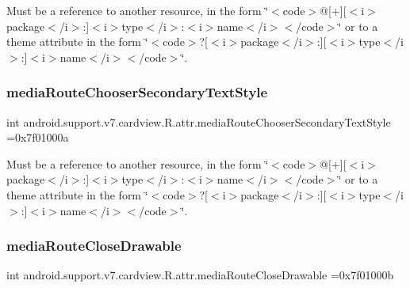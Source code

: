 Must be a reference to another resource, in the form \char`\"{}$<$code$>$@\mbox{[}+\mbox{]}\mbox{[}$<$i$>$package$<$/i$>$\+:\mbox{]}$<$i$>$type$<$/i$>$\+:$<$i$>$name$<$/i$>$$<$/code$>$\char`\"{} or to a theme attribute in the form \char`\"{}$<$code$>$?\mbox{[}$<$i$>$package$<$/i$>$\+:\mbox{]}\mbox{[}$<$i$>$type$<$/i$>$\+:\mbox{]}$<$i$>$name$<$/i$>$$<$/code$>$\char`\"{}. \mbox{\label{classandroid_1_1support_1_1v7_1_1cardview_1_1R_1_1attr_a9c40842d57e474f03ba0002459fc14d2}} 
\subsubsection{\texorpdfstring{media\+Route\+Chooser\+Secondary\+Text\+Style}{mediaRouteChooserSecondaryTextStyle}}
{\footnotesize\ttfamily int android.\+support.\+v7.\+cardview.\+R.\+attr.\+media\+Route\+Chooser\+Secondary\+Text\+Style =0x7f01000a\hspace{0.3cm}{\ttfamily [static]}}

Must be a reference to another resource, in the form \char`\"{}$<$code$>$@\mbox{[}+\mbox{]}\mbox{[}$<$i$>$package$<$/i$>$\+:\mbox{]}$<$i$>$type$<$/i$>$\+:$<$i$>$name$<$/i$>$$<$/code$>$\char`\"{} or to a theme attribute in the form \char`\"{}$<$code$>$?\mbox{[}$<$i$>$package$<$/i$>$\+:\mbox{]}\mbox{[}$<$i$>$type$<$/i$>$\+:\mbox{]}$<$i$>$name$<$/i$>$$<$/code$>$\char`\"{}. \mbox{\label{classandroid_1_1support_1_1v7_1_1cardview_1_1R_1_1attr_a99f4420078603d5f11efed05b8d90584}} 
\subsubsection{\texorpdfstring{media\+Route\+Close\+Drawable}{mediaRouteCloseDrawable}}
{\footnotesize\ttfamily int android.\+support.\+v7.\+cardview.\+R.\+attr.\+media\+Route\+Close\+Drawable =0x7f01000b\hspace{0.3cm}{\ttfamily [static]}}

